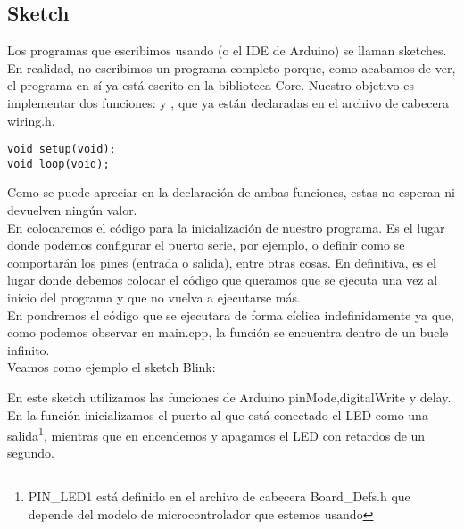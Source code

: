 \subsection{Sketch}
Los programas que escribimos usando  (o el IDE de Arduino) se llaman sketches. En realidad, no escribimos un programa completo porque, como acabamos de ver, el programa en sí ya está escrito en la biblioteca Core. Nuestro objetivo es implementar dos funciones:  y , que ya están declaradas en el archivo de cabecera wiring.h.\\
\begin{lstlisting}[caption=Sección de wiring.h]
void setup(void);
void loop(void);
\end{lstlisting}

Como se puede apreciar en la declaración de ambas funciones, estas no esperan ni devuelven ningún valor.\\

En  colocaremos el código para la inicialización de nuestro programa. Es el lugar donde podemos configurar el puerto serie, por ejemplo, o definir como se comportarán los pines (entrada o salida), entre otras cosas. En definitiva, es el lugar donde debemos colocar el código que queramos que se ejecuta una vez al inicio del programa y que no vuelva a ejecutarse más.\\
En  pondremos el código que se ejecutara de forma cíclica indefinidamente ya que, como podemos observar en main.cpp, la función  se encuentra dentro de un bucle infinito.\\

Veamos como ejemplo el sketch Blink:


En este sketch utilizamos las funciones de Arduino pinMode,digitalWrite y delay. En la función  inicializamos el puerto al que está conectado el LED como una salida\protect\footnote{PIN\_LED1 está definido en el archivo de cabecera Board\_Defs.h que depende del modelo de microcontrolador que estemos usando}, mientras que en  encendemos y apagamos el LED con retardos de un segundo.

